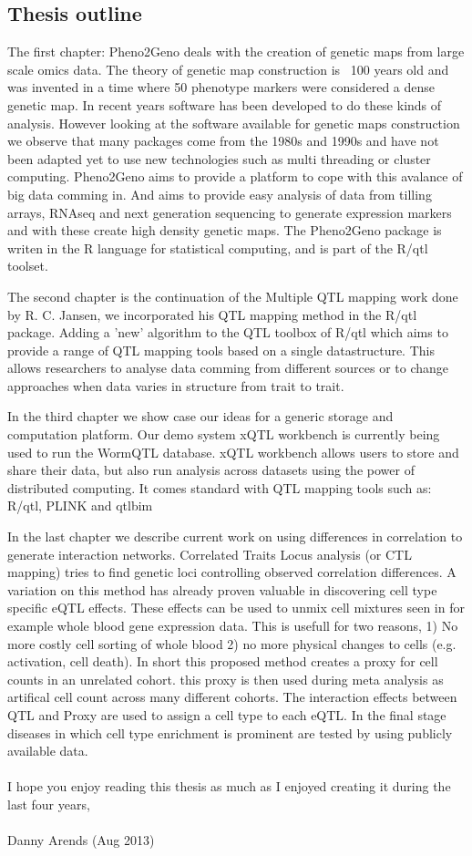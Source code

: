 \subsection{Thesis outline}

The first chapter: Pheno2Geno deals with the creation of genetic maps from large scale omics data. 
The theory of genetic map construction is ~100 years old and was invented in a time where 50 
phenotype markers were considered a dense genetic map. In recent years software has been developed to do these 
kinds of analysis. However looking at the software available for genetic maps construction we 
observe that many packages come from the 1980s and 1990s and have not been adapted yet to use new 
technologies such as multi threading or cluster computing. Pheno2Geno aims to provide a platform to 
cope with this avalance of big data comming in. And aims to provide easy analysis of data from 
tilling arrays, RNAseq and next generation sequencing to generate expression markers and with these 
create high density genetic maps. The Pheno2Geno package is writen in the R language for statistical 
computing, and is part of the R/qtl toolset.

The second chapter is the continuation of the Multiple QTL mapping work done by R. C. Jansen, we 
incorporated his QTL mapping method in the R/qtl package. Adding a 'new' algorithm to the QTL 
toolbox of R/qtl which aims to provide a range of QTL mapping tools based on a single datastructure. 
This allows researchers to analyse data comming from different sources or to change approaches when 
data varies in structure from trait to trait.

In the third chapter we show case our ideas for a generic storage and computation platform. Our demo 
system xQTL workbench is currently being used to run the WormQTL database. xQTL workbench allows 
users to store and share their data, but also run analysis across datasets using the power of 
distributed computing. It comes standard with  QTL mapping tools such as: R/qtl, PLINK and qtlbim

In the last chapter we describe current work on using differences in correlation to generate 
interaction networks. Correlated Traits Locus analysis (or CTL mapping) tries to find genetic 
loci controlling observed correlation differences. A variation on this method has already proven 
valuable in discovering cell type specific eQTL effects. These effects can be used to unmix cell 
mixtures seen in for example whole blood gene expression data. This is usefull for two reasons, 
1) No more costly cell sorting of whole blood 2) no more physical changes to cells (e.g. activation, 
cell death). In short this proposed method creates a proxy for cell counts in an unrelated cohort. 
this proxy is then used during meta analysis as artifical cell count across many different cohorts.
The interaction effects between QTL and Proxy are used to assign a cell type to each eQTL. In the final 
stage diseases in which cell type enrichment is prominent are tested by using publicly available data.\\\\

I hope you enjoy reading this thesis as much as I enjoyed creating it during the last four years,\\\\

Danny Arends (Aug 2013)

